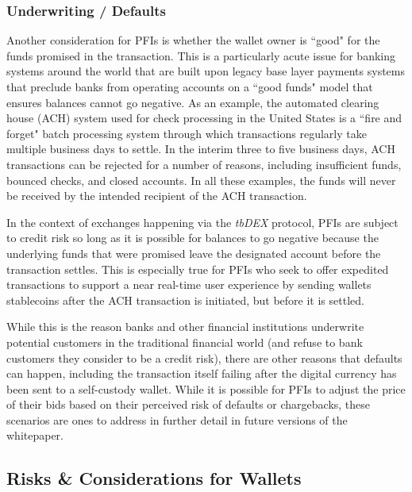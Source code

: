 \documentclass[11pt]{article}
\begin{document}
\subsubsection{Underwriting / Defaults}

Another consideration for PFIs is whether the wallet owner is ``good" for the funds promised in the transaction. This is a particularly acute issue for banking systems around the world that are built upon legacy base layer payments systems that preclude banks from operating accounts on a ``good funds" model that ensures balances cannot go negative. As an example, the automated clearing house (ACH) system used for check processing in the United States is a ``fire and forget" batch processing system through which transactions regularly take multiple business days to settle. In the interim three to five business days, ACH transactions can be rejected for a number of reasons, including insufficient funds, bounced checks, and closed accounts. In all these examples, the funds will never be received by the intended recipient of the ACH transaction.  

\vspace{1\baselineskip}
In the context of exchanges happening via the \textit{tbDEX} protocol, PFIs are subject to credit risk so long as it is possible for balances to go negative because the underlying funds that were promised leave the designated account before the transaction settles. This is especially true for PFIs who seek to offer expedited transactions to support a near real-time user experience by sending wallets stablecoins after the ACH transaction is initiated, but before it is settled. 

\vspace{1\baselineskip}
While this is the reason banks and other financial institutions underwrite potential customers in the traditional financial world (and refuse to bank customers they consider to be a credit risk), there are other reasons that defaults can happen, including the transaction itself failing after the digital currency has been sent to a self-custody wallet. While it is possible for PFIs to adjust the price of their bids based on their perceived risk of defaults or chargebacks, these scenarios are ones to address in further detail in future versions of the whitepaper. 

\vspace{1\baselineskip}
\subsection{Risks & Considerations for Wallets}
\end{document}

